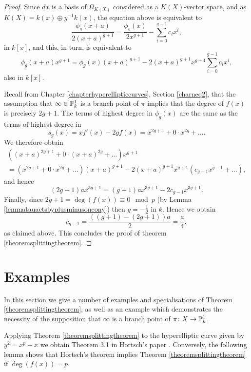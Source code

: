 \begin{proof}
    Since $dx$ is a basis of $\Omega_{K(X)}$ considered as a $K(X)$-vector space, and as $K(X) = k(x) \oplus y^{-1}k(x)$, the equation above is equivalent to
        \[
        \frac{\phi_g(x+a)}{2(x+a)^{g+1}} = \frac{\phi_g(x)}{2x^{g+1}} - \sum_{i=0}^{g-1} c_i x^i,
        \]
    in $k[x]$, and this, in turn, is equivalent to
        \[
        \phi_g(x+a)x^{g+1} = \phi_g(x)(x+a)^{g+1} - 2(x+a)^{g+1}x^{g+1}\sum_{i=0}^{g-1}c_i x^i,
        \]
    also in $k[x]$.

    Recall from Chapter \ref{chapterhyperellipticcurves}, Section \ref{charneq2}, that the assumption that $\infty \in {\mathbb P}_k^1$ is a branch point of $\pi$ implies that the degree of $f(x)$ is precisely $2g+1$.
    The terms of highest degree in $\phi_g(x)$ are the same as the terms of highest degree in 
        \[
        s_g(x) = xf'(x) - 2gf(x) = x^{2g+1} + 0\cdot x^{2g} + \ldots.
        \]
    We therefore obtain
        \begin{multline*}
        \left( (x+a)^{2g+1} + 0 \cdot (x+a)^{2g} + \ldots \right) x^{g+1}  \\ = (x^{2g+1} + 0 \cdot x^{2g} + \ldots )(x+a)^{g+1} - 2(x+a)^{g+1}x^{g+1}(c_{g-1}x^{g-1} + \ldots ),
        \end{multline*}
    and hence
        \[
        (2g+1)ax^{3g+1} = (g+1)ax^{3g+1} - 2c_{g-1}x^{3g+1}.
        \]
    Finally, since $2g + 1= \deg(f(x)) \equiv 0 \mod p$ (by Lemma \ref{lemmatauactsbyplusminusoneony}) then $g = -\frac{1}{2}$ in $k$.
    Hence we obtain
        \[
        c_{g-1} = \frac{((g+1) - (2g+1))a}{2} = \frac{a}{4},
        \]  
    as claimed above.
    This concludes the proof of theorem \ref{theoremsplittingtheorem}.
    \end{proof}


\section{Examples}

In this section we give a number of examples and specialisations of Theorem \ref{theoremsplittingtheorem}, as well as an example which demonstrates the necessity of the supposition that $\infty$ is a branch point of $\pi \colon X \rightarrow {\mathbb P}_k^1$.

Applying Theorem \ref{theoremsplittingtheorem} to the hyperelliptic curve given by $y^2 = x^p - x$ we obtain Theorem 3.1 in Hortsch's paper \cite{canonicalrepresentation}. 
Conversely, the following lemma shows that Hortsch's theorem implies Theorem \ref{theoremsplittingtheorem} if $\deg(f(x)) = p$.

